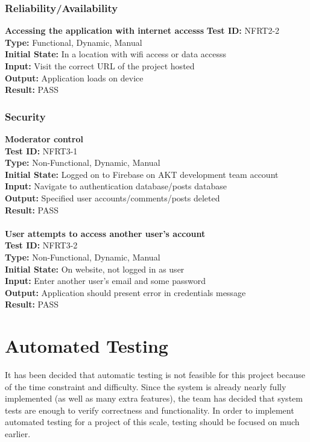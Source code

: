 \documentclass[12pt,fleqn]{article}
\begin{document}
\subsubsection{Reliability/Availability}
\textbf{Accessing the application with internet accesss}
\textbf{Test ID:} NFRT2-2\\ 
\textbf{Type:} Functional, Dynamic, Manual\\
\textbf{Initial State:} In a location with wifi access or data accesss \\
\textbf{Input:} Visit the correct URL of the project hosted\\
\textbf{Output:} Application loads on device \\
\textbf{Result:} PASS

\subsubsection{Security}
\textbf{Moderator control}\\
\textbf{Test ID:} NFRT3-1\\
\textbf{Type:} Non-Functional, Dynamic, Manual\\
\textbf{Initial State:} Logged on to Firebase on AKT development team account \\
\textbf{Input:} Navigate to authentication database/posts database \\
\textbf{Output:} Specified user accounts/comments/posts deleted\\
\textbf{Result:} PASS
\\
\\
\textbf{User attempts to access another user's account}\\
\textbf{Test ID:} NFRT3-2\\
\textbf{Type:} Non-Functional, Dynamic, Manual\\
\textbf{Initial State:} On website, not logged in as user \\
\textbf{Input:} Enter another user's email and some password \\
\textbf{Output:} Application should present error in credentials message\\
\textbf{Result:} PASS

\section {Automated Testing}
It has been decided that automatic testing is not feasible for this project because of the time constraint and difficulty. Since the system is already nearly fully implemented (as well as many extra features), the team has decided that system tests are enough to verify correctness and functionality. In order to implement automated testing for a project of this scale, testing should be focused on much earlier.
\end{document}
